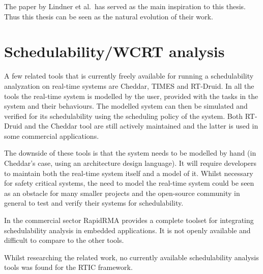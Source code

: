 The paper by Lindner et al.\ has served as the main inspiration to this thesis.
Thus this thesis can be seen as the natural evolution of their work.

\section{Schedulability/WCRT analysis}
A few related tools that is currently freely available for running a
schedulability analyzation on real-time systems are Cheddar\cite{cheddar},
TIMES\cite{timestool} and RT-Druid\cite{rtdruid}. In all the tools the
real-time system is modelled by the user, provided with the tasks in the system
and their behaviours. The modelled system can then be simulated and verified
for its schedulability using the scheduling policy of the system. Both RT-Druid
and the Cheddar tool are still actively maintained and the latter is used in
some commercial applications\cite{ellidiss}.

The downside of these tools is that the system needs to be modelled by hand
(in Cheddar's case, using an architecture design language). It will require
developers to maintain both the real-time system itself and a model of it.
Whilst necessary for safety critical systems, the need to model the real-time
system could be seen as an obstacle for many smaller projects and the
open-source community in general to test and verify their systems for
schedulability.

In the commercial sector RapidRMA\cite{rapidrma} provides a complete toolset
for integrating schedulability analysis in embedded applications. It is not
openly available and difficult to compare to the other tools.

Whilst researching the related work, no currently available schedulability
analysis tools was found for the RTIC framework.
